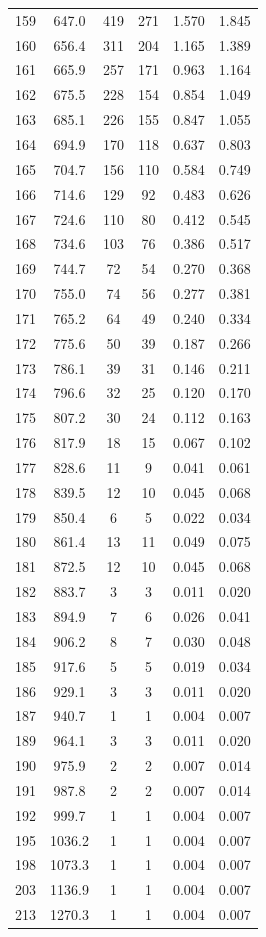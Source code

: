 \documentclass[
]{article}
\begin{document}
\begin{longtable}[t]{cccccc}
159 & 647.0 & 419 & 271 & 1.570 & 1.845\\
160 & 656.4 & 311 & 204 & 1.165 & 1.389\\
161 & 665.9 & 257 & 171 & 0.963 & 1.164\\
162 & 675.5 & 228 & 154 & 0.854 & 1.049\\
163 & 685.1 & 226 & 155 & 0.847 & 1.055\\
164 & 694.9 & 170 & 118 & 0.637 & 0.803\\
165 & 704.7 & 156 & 110 & 0.584 & 0.749\\
166 & 714.6 & 129 & 92 & 0.483 & 0.626\\
167 & 724.6 & 110 & 80 & 0.412 & 0.545\\
168 & 734.6 & 103 & 76 & 0.386 & 0.517\\
169 & 744.7 & 72 & 54 & 0.270 & 0.368\\
170 & 755.0 & 74 & 56 & 0.277 & 0.381\\
171 & 765.2 & 64 & 49 & 0.240 & 0.334\\
172 & 775.6 & 50 & 39 & 0.187 & 0.266\\
173 & 786.1 & 39 & 31 & 0.146 & 0.211\\
174 & 796.6 & 32 & 25 & 0.120 & 0.170\\
175 & 807.2 & 30 & 24 & 0.112 & 0.163\\
176 & 817.9 & 18 & 15 & 0.067 & 0.102\\
177 & 828.6 & 11 & 9 & 0.041 & 0.061\\
178 & 839.5 & 12 & 10 & 0.045 & 0.068\\
179 & 850.4 & 6 & 5 & 0.022 & 0.034\\
180 & 861.4 & 13 & 11 & 0.049 & 0.075\\
181 & 872.5 & 12 & 10 & 0.045 & 0.068\\
182 & 883.7 & 3 & 3 & 0.011 & 0.020\\
183 & 894.9 & 7 & 6 & 0.026 & 0.041\\
184 & 906.2 & 8 & 7 & 0.030 & 0.048\\
185 & 917.6 & 5 & 5 & 0.019 & 0.034\\
186 & 929.1 & 3 & 3 & 0.011 & 0.020\\
187 & 940.7 & 1 & 1 & 0.004 & 0.007\\
189 & 964.1 & 3 & 3 & 0.011 & 0.020\\
190 & 975.9 & 2 & 2 & 0.007 & 0.014\\
191 & 987.8 & 2 & 2 & 0.007 & 0.014\\
192 & 999.7 & 1 & 1 & 0.004 & 0.007\\
195 & 1036.2 & 1 & 1 & 0.004 & 0.007\\
198 & 1073.3 & 1 & 1 & 0.004 & 0.007\\
203 & 1136.9 & 1 & 1 & 0.004 & 0.007\\
213 & 1270.3 & 1 & 1 & 0.004 & 0.007\\
\bottomrule
\end{longtable}
\end{document}
